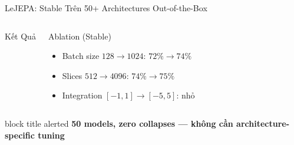 \documentclass[aspectratio=169,11pt]{beamer}
\newcommand{\takeaway}[1]{%
  \vfill
  \begin{beamercolorbox}[sep=4pt,center,rounded=true]{block title alerted}
    \small\bfseries #1
  \end{beamercolorbox}%
}
\begin{document}
\begin{frame}{LeJEPA: Stable Trên 50+ Architectures Out-of-the-Box}
\begin{columns}[c]
\begin{block}{Kết Quả}
  \end{block}
  \vspace{4pt}
  \begin{exampleblock}{Ablation (Stable)}\footnotesize
    \begin{itemize}
        \item Batch size $128 \to 1024$: $72\% \to 74\%$
        \item Slices $512 \to 4096$: $74\% \to 75\%$
        \item Integration $[-1,1] \to [-5,5]$: nhỏ
    \end{itemize}
  \end{exampleblock}
\end{columns}
\takeaway{50 models, zero collapses — không cần architecture-specific tuning}
\end{frame}
\end{document}

